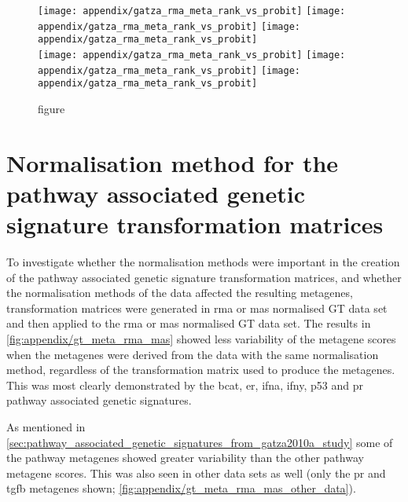 	\begin{figure}[htpb]
		\ContinuedFloat
		\captionsetup{list=off,format=cont}
		\centering
		\texttt{[image: appendix/gatza\_rma\_meta\_rank\_vs\_probit]}
		\texttt{[image: appendix/gatza\_rma\_meta\_rank\_vs\_probit]}
		\texttt{[image: appendix/gatza\_rma\_meta\_rank\_vs\_probit]}\\
		\texttt{[image: appendix/gatza\_rma\_meta\_rank\_vs\_probit]}
		\texttt{[image: appendix/gatza\_rma\_meta\_rank\_vs\_probit]}
		\texttt{[image: appendix/gatza\_rma\_meta\_rank\_vs\_probit]}\\
		\vspace{1em}
		\caption[]{figure}
	\end{figure}

	\section{Normalisation method for the pathway associated genetic signature transformation matrices}
	\label{sec:normalisation_method_for_pathway_associated_genetic_signature_transformation_matrices}

	To investigate whether the normalisation methods were important in the creation of the pathway associated genetic signature transformation matrices, and whether the normalisation methods of the data affected the resulting metagenes, transformation matrices were generated in \gls{rma} or \gls{mas} normalised GT data set and then applied to the \gls{rma} or \gls{mas} normalised GT data set.
	The results in \cref{fig:appendix/gt_meta_rma_mas} showed less variability of the metagene scores when the metagenes were derived from the data with the same normalisation method, regardless of the transformation matrix used to produce the metagenes.
	This was most clearly demonstrated by the \gls{bcat}, \gls{er}, \gls{ifna}, \gls{ifny}, p53 and \gls{pr} pathway associated genetic signatures.

	As mentioned in \cref{sec:pathway_associated_genetic_signatures_from_gatza2010a_study} some of the pathway metagenes showed greater variability than the other pathway metagene scores.
	This was also seen in other data sets as well (only the \gls{pr} and \gls{tgfb} metagenes shown; \cref{fig:appendix/gt_meta_rma_mas_other_data}).

